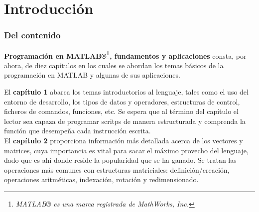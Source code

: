 \chapter*{Introducción}

\subsection*{Del contenido}

\textbf{Programación en MATLAB®\footnote{\emph{MATLAB® es una marca
  registrada de MathWorks, Inc.}}, fundamentos y aplicaciones} consta,
por ahora, de diez capítulos en los cuales se abordan los temas básicos
de la programación en MATLAB y algunas de sus aplicaciones. 



El \textbf{capítulo 1} abarca los temas introductorios al lenguaje,
tales como el uso del entorno de desarrollo, los tipos de datos y
operadores, estructuras de control, ficheros de comandos, funciones, etc.
Se espera que al término del capítulo el lector sea capaza de programar 
scritps de manera estructurada y comprenda la función que desempeña 
cada instrucción escrita. \\

El \textbf{capítulo 2} proporciona información más detallada acerca de
los vectores y matrices, cuya importancia es vital para sacar el máximo
provecho del lenguaje, dado que es ahí donde reside la popularidad que
se ha ganado. Se tratan las operaciones más comunes con estructuras 
matriciales: definición/creación, operaciones aritméticas, indexación, 
rotación y redimensionado. \\

